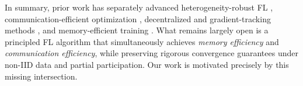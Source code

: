 In summary, prior work has separately advanced heterogeneity-robust FL \cite{li2018fedprox,karimireddy2019scaffold,wang2020objective}, communication-efficient optimization \cite{alistarh2016qsgd,richtarik2021ef21,li2020accelerationcompressed,huang2022lowerbounds,tyurin2022dasha,zhao2022beer}, decentralized and gradient-tracking methods \cite{lian2017dpsgd,tang2018d2,koloskova2022improved,ghiasvand2024robust}, and memory-efficient training \cite{zhao2024galore,he2024subspace,horvath2024frugal,wu2024progressive,chen2025splitfl,tinyfel2025}. What remains largely open is a principled FL algorithm that simultaneously achieves \emph{memory efficiency} and \emph{communication efficiency}, while preserving rigorous convergence guarantees under non-IID data and partial participation. Our work is motivated precisely by this missing intersection.
